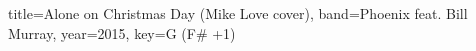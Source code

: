 \documentclass{../../tex/bekki-leadsheet}
\begin{document}
\begin{song}[transpose=1]{title={Alone on Christmas Day (Mike Love cover)}, band={Phoenix feat. Bill Murray}, year={2015}, key={G (F# +1)}}

  

\end{song}
\end{document}
